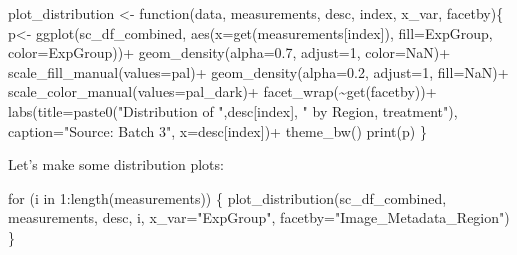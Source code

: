 \documentclass[
  12pt,
  letterpaper,
  DIV=11,
  numbers=noendperiod]{scrartcl}
\newenvironment{Shaded}{\begin{snugshade}}{\end{snugshade}}
\newcommand{\AttributeTok}[1]{\textcolor[rgb]{0.40,0.45,0.13}{#1}}
\newcommand{\ConstantTok}[1]{\textcolor[rgb]{0.56,0.35,0.01}{#1}}
\newcommand{\ControlFlowTok}[1]{\textcolor[rgb]{0.00,0.23,0.31}{#1}}
\newcommand{\DecValTok}[1]{\textcolor[rgb]{0.68,0.00,0.00}{#1}}
\newcommand{\FloatTok}[1]{\textcolor[rgb]{0.68,0.00,0.00}{#1}}
\newcommand{\FunctionTok}[1]{\textcolor[rgb]{0.28,0.35,0.67}{#1}}
\newcommand{\NormalTok}[1]{\textcolor[rgb]{0.00,0.23,0.31}{#1}}
\newcommand{\OtherTok}[1]{\textcolor[rgb]{0.00,0.23,0.31}{#1}}
\newcommand{\SpecialCharTok}[1]{\textcolor[rgb]{0.37,0.37,0.37}{#1}}
\newcommand{\StringTok}[1]{\textcolor[rgb]{0.13,0.47,0.30}{#1}}
\begin{document}
\begin{Shaded}
\begin{Highlighting}[]
\NormalTok{plot\_distribution }\OtherTok{\textless{}{-}} \ControlFlowTok{function}\NormalTok{(data, measurements, desc, index, x\_var, facetby)\{}
\NormalTok{  p}\OtherTok{\textless{}{-}} \FunctionTok{ggplot}\NormalTok{(sc\_df\_combined, }\FunctionTok{aes}\NormalTok{(}\AttributeTok{x=}\FunctionTok{get}\NormalTok{(measurements[index]), }\AttributeTok{fill=}\NormalTok{ExpGroup, }\AttributeTok{color=}\NormalTok{ExpGroup))}\SpecialCharTok{+}
  \FunctionTok{geom\_density}\NormalTok{(}\AttributeTok{alpha=}\FloatTok{0.7}\NormalTok{, }\AttributeTok{adjust=}\DecValTok{1}\NormalTok{, }\AttributeTok{color=}\ConstantTok{NaN}\NormalTok{)}\SpecialCharTok{+}
  \FunctionTok{scale\_fill\_manual}\NormalTok{(}\AttributeTok{values=}\NormalTok{pal)}\SpecialCharTok{+}
  \FunctionTok{geom\_density}\NormalTok{(}\AttributeTok{alpha=}\FloatTok{0.2}\NormalTok{, }\AttributeTok{adjust=}\DecValTok{1}\NormalTok{, }\AttributeTok{fill=}\ConstantTok{NaN}\NormalTok{)}\SpecialCharTok{+}
  \FunctionTok{scale\_color\_manual}\NormalTok{(}\AttributeTok{values=}\NormalTok{pal\_dark)}\SpecialCharTok{+}
  \FunctionTok{facet\_wrap}\NormalTok{(}\SpecialCharTok{\textasciitilde{}}\FunctionTok{get}\NormalTok{(facetby))}\SpecialCharTok{+}
  \FunctionTok{labs}\NormalTok{(}\AttributeTok{title=}\FunctionTok{paste0}\NormalTok{(}\StringTok{"Distribution of "}\NormalTok{,desc[index], }\StringTok{" by Region, treatment"}\NormalTok{), }
       \AttributeTok{caption=}\StringTok{"Source: Batch 3"}\NormalTok{,}
       \AttributeTok{x=}\NormalTok{desc[index])}\SpecialCharTok{+}
  \FunctionTok{theme\_bw}\NormalTok{()}
  \FunctionTok{print}\NormalTok{(p)}
\NormalTok{\}}
\end{Highlighting}
\end{Shaded}

Let's make some distribution plots:

\begin{Shaded}
\begin{Highlighting}[]
\ControlFlowTok{for}\NormalTok{ (i }\ControlFlowTok{in} \DecValTok{1}\SpecialCharTok{:}\FunctionTok{length}\NormalTok{(measurements)) \{}
  \FunctionTok{plot\_distribution}\NormalTok{(sc\_df\_combined, measurements, desc, i, }\AttributeTok{x\_var=}\StringTok{"ExpGroup"}\NormalTok{, }\AttributeTok{facetby=}\StringTok{"Image\_Metadata\_Region"}\NormalTok{)}
\NormalTok{\}}
\end{Highlighting}
\end{Shaded}
\end{document}
